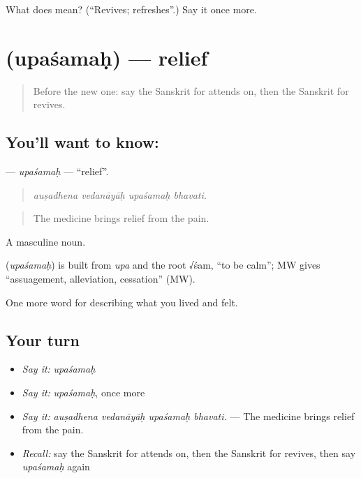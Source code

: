 \begin{tcolorbox}[breakable,colback=teal!4,colframe=teal!35!black,title={Before you move on}]
What does  mean? (\textquotedblleft{}Revives; refreshes\textquotedblright{}.) Say it once more.
\end{tcolorbox}
\section[\texorpdfstring{\sk{उपशमः} (upaśamaḥ)}{उपशमः (upaśamaḥ)}]{ (upaśamaḥ) — relief}

\label{lesson:SA-C485-upasamah}



\begin{quote}
Before the new one: say the Sanskrit for attends on, then the Sanskrit for revives.
\end{quote}

\subsection*{You'll want to know: }
\textbf{} — \emph{upaśamaḥ} — \textquotedblleft{}relief\textquotedblright{}.

\begin{quote}
   
\end{quote}

\begin{quote}
\emph{auṣadhena vedanāyāḥ upaśamaḥ bhavati.}
\end{quote}

\begin{quote}
The medicine brings relief from the pain.
\end{quote}

A masculine noun.

\begin{cousinweb}
\textbf{} (\emph{upaśamaḥ}) is built from \emph{upa} and the root √śam, \textquotedblleft{}to be calm\textquotedblright{}; MW gives \textquotedblleft{}assuagement, alleviation, cessation\textquotedblright{} (MW).
\end{cousinweb}

\begin{grammarlens}[title={What you've built}]
One more word for describing what you lived and felt.
\end{grammarlens}

\subsection*{Your turn}
\begin{itemize}
\raggedright
  \item \emph{Say it:} \emph{upaśamaḥ}
  \item \emph{Say it:} \emph{upaśamaḥ}, once more
  \item \emph{Say it:} \emph{auṣadhena vedanāyāḥ upaśamaḥ bhavati.} — The medicine brings relief from the pain.
  \item \emph{Recall:} say the Sanskrit for attends on, then the Sanskrit for revives, then say \emph{upaśamaḥ} again
\end{itemize}

